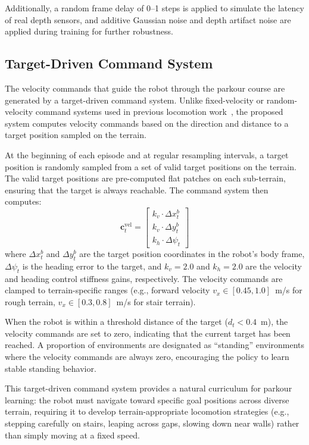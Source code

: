 Additionally, a random frame delay of 0--1 steps is applied to simulate the latency of real depth sensors, and additive Gaussian noise and depth artifact noise are applied during training for further robustness.

\subsection{Target-Driven Command System}
\label{sec:target_command}

The velocity commands that guide the robot through the parkour course are generated by a target-driven command system. Unlike fixed-velocity or random-velocity command systems used in previous locomotion work~\cite{rudin2016walk,margolis2024rapidlocomotion}, the proposed system computes velocity commands based on the direction and distance to a target position sampled on the terrain.

At the beginning of each episode and at regular resampling intervals, a target position is randomly sampled from a set of valid target positions on the terrain. The valid target positions are pre-computed flat patches on each sub-terrain, ensuring that the target is always reachable. The command system then computes:
\begin{equation}
    \mathbf{c}_t^{\text{vel}} = \begin{bmatrix} k_v \cdot \Delta x_t^b \\ k_v \cdot \Delta y_t^b \\ k_h \cdot \Delta \psi_t \end{bmatrix}
\end{equation}
where $\Delta x_t^b$ and $\Delta y_t^b$ are the target position coordinates in the robot's body frame, $\Delta \psi_t$ is the heading error to the target, and $k_v = 2.0$ and $k_h = 2.0$ are the velocity and heading control stiffness gains, respectively. The velocity commands are clamped to terrain-specific ranges (e.g., forward velocity $v_x \in [0.45, 1.0]$~m/s for rough terrain, $v_x \in [0.3, 0.8]$~m/s for stair terrain).

When the robot is within a threshold distance of the target ($d_t < 0.4$~m), the velocity commands are set to zero, indicating that the current target has been reached. A proportion of environments are designated as ``standing'' environments where the velocity commands are always zero, encouraging the policy to learn stable standing behavior.

This target-driven command system provides a natural curriculum for parkour learning: the robot must navigate toward specific goal positions across diverse terrain, requiring it to develop terrain-appropriate locomotion strategies (e.g., stepping carefully on stairs, leaping across gaps, slowing down near walls) rather than simply moving at a fixed speed.

